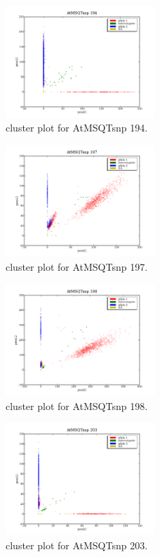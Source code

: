 \begin{figure}[H]
\includegraphics[width=0.5\textwidth]{figures/cluster_plot_AtMSQTsnp_194.png}
\caption{cluster plot for AtMSQTsnp 194.} \label{flAtMSQTsnp194}
\end{figure}
\begin{figure}[H]
\includegraphics[width=0.5\textwidth]{figures/cluster_plot_AtMSQTsnp_197.png}
\caption{cluster plot for AtMSQTsnp 197.} \label{flAtMSQTsnp197}
\end{figure}
\begin{figure}[H]
\includegraphics[width=0.5\textwidth]{figures/cluster_plot_AtMSQTsnp_198.png}
\caption{cluster plot for AtMSQTsnp 198.} \label{flAtMSQTsnp198}
\end{figure}
\begin{figure}[H]
\includegraphics[width=0.5\textwidth]{figures/cluster_plot_AtMSQTsnp_203.png}
\caption{cluster plot for AtMSQTsnp 203.} \label{flAtMSQTsnp203}
\end{figure}
